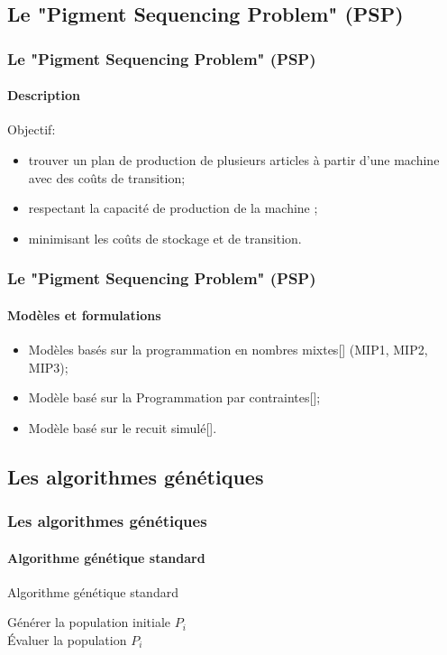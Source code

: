\documentclass[11pt]{beamer}
\begin{document}
 \subsection{Le "Pigment Sequencing Problem" (PSP)}
 \begin{frame}
 \frametitle{Le "Pigment Sequencing Problem" (PSP)}
 \framesubtitle{Description}
 
 	Objectif:
    \begin{itemize}
    	\item trouver un plan de production de plusieurs articles à partir d’une
machine avec des coûts de transition;
    	\item respectant la capacité de production de la machine ;
    	\item minimisant les coûts de stockage et de transition.
    \end{itemize}
 \end{frame}
 
 \begin{frame}
 \frametitle{Le "Pigment Sequencing Problem" (PSP)}
 \framesubtitle{Modèles et formulations}
 
    \begin{itemize}
    	\item Modèles basés sur la programmation en nombres mixtes[] (MIP1, MIP2, MIP3);
    	\item Modèle basé sur la Programmation par contraintes[];
    	\item Modèle basé sur le recuit simulé[].
    \end{itemize}
 
 \end{frame}
 
 \subsection{Les algorithmes génétiques}
 \begin{frame}
 \frametitle{Les algorithmes génétiques}
 \framesubtitle{Algorithme génétique standard}
 
 	\begin{algorithm}[H]
 	\caption{Algorithme génétique standard \cite{Goncalves}}
 	\label{algo:algo_genetique_standard}
 	Générer la population initiale $P_{i}$ \\
 	Évaluer la population $P_{i}$ \\
	\end{algorithm}
 \end{frame}
 
\end{document}
